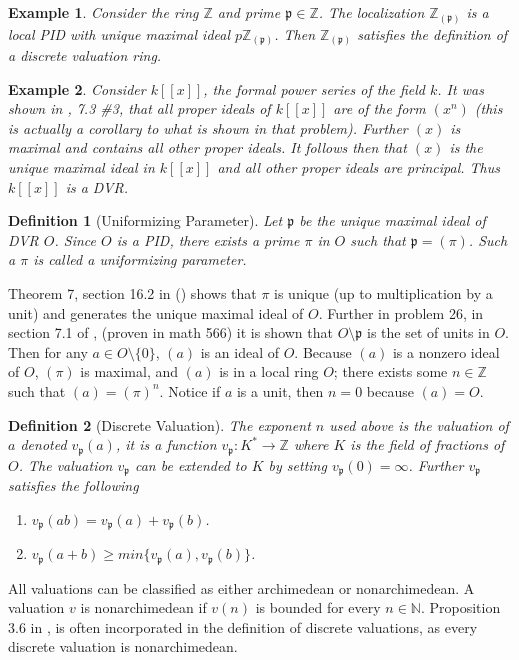 \documentclass[paper=a4, fontsize=11pt]{scrartcl} %
\numberwithin{equation}{section} %
\numberwithin{figure}{section} %
\numberwithin{table}{section} %
\theoremstyle{break}
\newtheorem{defn}{Definition}
\newtheorem{ex}{Example}
\begin{document}
\begin{ex} Consider the ring $\mathbb{Z}$ and prime $\mathfrak{p} \in \mathbb{Z}$. The localization $\mathbb{Z}_{(\mathfrak{p})}$ is a local PID with unique maximal ideal $p\mathbb{Z}_{(\mathfrak{p})}$. Then $\mathbb{Z}_{(\mathfrak{p})}$ satisfies the definition of a discrete valuation ring.
\end{ex}
\begin{ex} Consider $k[[x]]$, the formal power series of the field $k$. It was shown in  \cite{DnF}, 7.3 \#3, that all proper ideals of $k[[x]]$ are of the form $(x^n)$ (this is actually a corollary to what is shown in that problem). Further $(x)$ is maximal and contains all other proper ideals. It follows then that $(x)$ is the unique maximal ideal in $k[[x]]$ and all other proper ideals are principal. Thus $k[[x]]$ is a DVR.
\end{ex}
\begin{defn}[Uniformizing Parameter]
Let $\mathfrak{p}$ be the unique maximal ideal of DVR $O$. Since $O$ is a PID, there exists a prime $\pi$ in $O$ such that $\mathfrak{p}=(\pi)$. Such a $\pi$ is called a uniformizing parameter.
\end{defn}
Theorem 7, section 16.2 in (\cite{DnF}) shows that $\pi$ is unique (up to multiplication by a unit) and generates the unique maximal ideal of $O$. Further in problem 26, in section 7.1 of \cite{DnF}, (proven in math 566) it is shown that $O \setminus \mathfrak{p}$ is the set of units in $O$. Then for any $a\in O\setminus \{0\}$, $(a)$ is an ideal of $O$. Because $(a)$ is a nonzero ideal of $O$, $(\pi)$ is maximal, and $(a)$ is in a local ring $O$; there exists some $n\in \mathbb{Z}$ such that $(a) = (\pi)^n$. Notice if $a$ is a unit, then $n=0$ because $(a)=O$. 
\begin{defn}[Discrete Valuation]
The exponent $n$ used above is the valuation of $a$ denoted $v_\mathfrak{p}(a)$, it is a function $v_\mathfrak{p}:K^* \to \mathbb{Z}$ where $K$ is the field of fractions of $O$. The valuation $v_\mathfrak{p}$ can be extended to $K$ by setting $v_\mathfrak{p}(0) = \infty$. Further $v_\mathfrak{p}$ satisfies the following
\begin{enumerate}
\item $v_\mathfrak{p}(ab)=v_\mathfrak{p}(a) + v_\mathfrak{p}(b)$.
\item $v_\mathfrak{p}(a+b) \geq min\{v_\mathfrak{p}(a),v_\mathfrak{p}(b) \}$.
\end{enumerate}
\end{defn}
All valuations can be classified as either archimedean or nonarchimedean. A valuation $v$ is nonarchimedean if $v(n)$ is bounded for every $n\in \mathbb{N}$. Proposition 3.6 in \cite{Neukirch}, is often incorporated in the definition of discrete valuations, as every discrete valuation is nonarchimedean.
\end{document}
